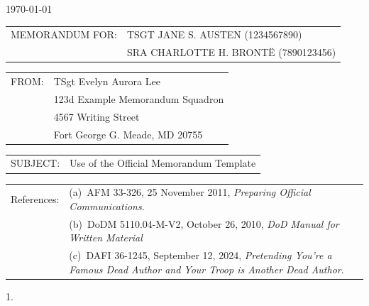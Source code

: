 \documentclass[12pt]{article}
\newlength{\extraSpaceLength}
\newcommand{\setcolumnwidth}[2]{
    \newlength{#1}%
    \settowidth{#1}{#2}%
    \addtolength{#1}{\extraSpaceLength} %
}
\begin{document}
\pagestyle{default}
\thispagestyle{firstpage}


\noindent\hfill\monthyeardate\today


\setcolumnwidth{\memoWidth}{MEMORANDUM FOR:}
\noindent
\begin{tabularx}{\textwidth}{@{} p{\memoWidth} @{} X @{}} 
MEMORANDUM FOR: & TSGT JANE S. AUSTEN (1234567890)\\
                & SRA CHARLOTTE H. BRONTË (7890123456)\\
\end{tabularx}

\setcolumnwidth{\fromWidth}{FROM:}
\noindent
\begin{tabularx}{\textwidth}{@{} p{\fromWidth} @{} X @{}} 
FROM: & TSgt Evelyn Aurora Lee\\
      & 123d Example Memorandum Squadron\\
      & 4567 Writing Street\\
      & Fort George G. Meade, MD 20755 \\
\end{tabularx}

\setcolumnwidth{\subjectWidth}{SUBJECT:}
\noindent
\begin{tabularx}{\textwidth}{@{} p{\subjectWidth} @{} X @{}} 
SUBJECT: & Use of the Official Memorandum Template\\
\end{tabularx}

\setcolumnwidth{\referencesWidth}{References:}
\noindent
\begin{tabularx}{\textwidth}{@{} p{} @{} X @{}} 
References: & (a)~AFM 33-326, 25 November 2011, \textit{Preparing Official Communications}.\\
            & (b)~DoDM 5110.04-M-V2, October 26, 2010, \textit{DoD Manual for Written Material} \\
            & (c)~DAFI 36-1245, September 12, 2024, \textit{Pretending You're a Famous Dead Author and Your Troop is Another Dead Author}.\\
\end{tabularx}

1.~\lipsum[1-31]

\end{document}
